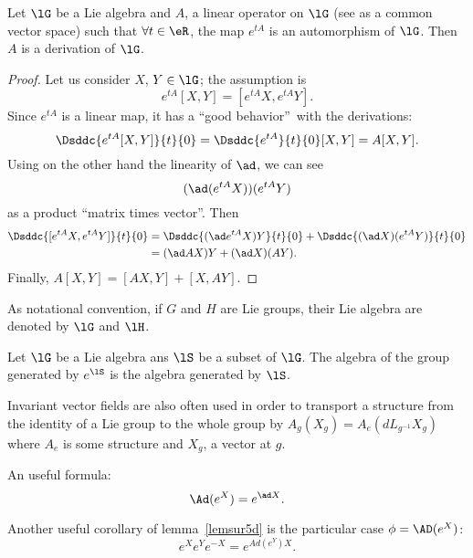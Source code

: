 \begin{lemma}
	Let $\lG$ be a Lie algebra and $A$, a linear operator on $\lG$ (see as a common vector space) such that $\forall t\in\eR$, the map $e^{tA}$ is an automorphism of $\lG$. Then $A$ is a derivation of $\lG$.
	\label{lem:autom_derr}
\end{lemma}

\begin{proof}
	Let us consider $X$, $Y\in\lG$;  the assumption is
	\[
		e^{tA}[X,Y]=[e^{tA}X,e^{tA}Y].
	\]
	Since $e^{tA}$ is a linear map, it has a ``good behavior''\ with the derivations:
	\[
		\Dsddc{e^{tA}[X,Y]}{t}{0}=\Dsddc{e^{tA}}{t}{0}[X,Y]=A[X,Y].
	\]
	Using on the other hand the linearity of $\ad$, we can see
	\[
		(\ad(e^{tA}X))(e^{tA}Y)
	\]
	as a product ``matrix times vector''. Then
	\begin{equation}
		\begin{split}
			\Dsddc{[e^{tA}X,e^{tA}Y]}{t}{0}&=\Dsddc{(\ad e^{tA}X)Y}{t}{0}+\Dsddc{(\ad X)(e^{tA}Y)}{t}{0}\\
			&=(\ad AX)Y+(\ad X)(AY).
		\end{split}
	\end{equation}
	Finally, $A[X,Y]=[AX,Y]+[X,AY]$.

\end{proof}

As notational convention, if $G$ and $H$ are Lie groups, their Lie algebra are denoted by $\lG$ and $\lH$.

\begin{lemma}		\label{LemAlgEtGroupesGenere}
	Let $\lG$ be a Lie algebra ans $\lS$ be a subset of $\lG$. The algebra of the group generated by $ e^{\lS}$ is the algebra generated by $\lS$.
\end{lemma}

Invariant vector fields are also often used in order to transport a structure from the identity of a Lie group to the whole group by $A_g(X_g)=A_e(dL_{g^{-1}}X_g)$ where $A_e$ is some structure and $X_g$, a vector at $g$.


\begin{corollary}\label{Ad_e}
	An useful formula:
	\[
		\Ad(e^X)=e^{\ad X}.
	\]
\end{corollary}

\begin{corollary}
	Another useful corollary of lemma~\ref{lemsur5d} is the particular case $\phi=\AD(e^X)$:
	\[
		e^Xe^Ye^{-X}=e^{Ad(e^Y)X}.
	\]
	\label{cor:eXeYe-X}
\end{corollary}

